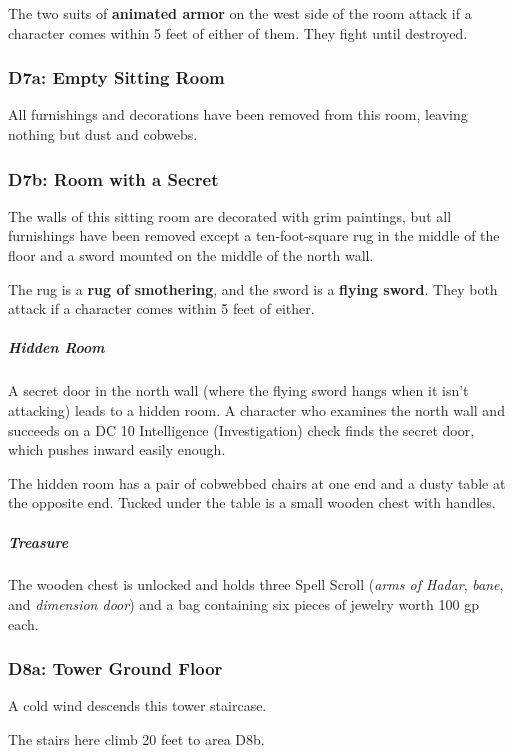 \documentclass[10pt,a4paper,twoside,bg=print,twocolumn,openany,nodeprecatedcode]{dndbook}
\begin{document}
The two suits of \textbf{animated armor} on the west side of the room attack if a character comes within 5 feet of either of them. They fight until destroyed.

\subsubsection{D7a: Empty Sitting Room}
All furnishings and decorations have been removed from this room, leaving nothing but dust and cobwebs.

\subsubsection{D7b: Room with a Secret}
\begin{DndReadAloud}{}
The walls of this sitting room are decorated with grim paintings, but all furnishings have been removed except a ten-foot-square rug in the middle of the floor and a sword mounted on the middle of the north wall.

\end{DndReadAloud}

The rug is a \textbf{rug of smothering}, and the sword is a \textbf{flying sword}. They both attack if a character comes within 5 feet of either.

\subparagraph{Hidden Room}
A secret door in the north wall (where the flying sword hangs when it isn't attacking) leads to a hidden room. A character who examines the north wall and succeeds on a DC 10 Intelligence (Investigation) check finds the secret door, which pushes inward easily enough.

The hidden room has a pair of cobwebbed chairs at one end and a dusty table at the opposite end. Tucked under the table is a small wooden chest with handles.

\subparagraph{Treasure}
The wooden chest is unlocked and holds three Spell Scroll (\textit{arms of Hadar}, \textit{bane}, and \textit{dimension door}) and a bag containing six pieces of jewelry worth 100 gp each.

\subsubsection{D8a: Tower Ground Floor}
\begin{DndReadAloud}{}
A cold wind descends this tower staircase.

\end{DndReadAloud}

The stairs here climb 20 feet to area D8b.
\end{document}

